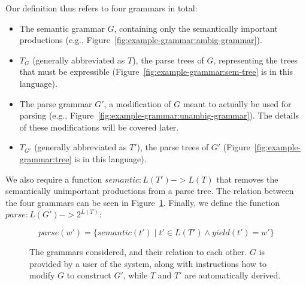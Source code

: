 \documentclass[sigplan]{acmart}\settopmatter{printfolios=true,printccs=false,printacmref=false}
\newcommand{\yield}{\mathit{yield}} %
\newcommand{\semantic}{\mathit{semantic}} %
\newcommand{\parse}{\mathit{parse}} %
\begin{document}
Our definition thus refers to four grammars in total:

\begin{itemize}
  \item The semantic grammar $G$, containing only the semantically important productions (e.g., Figure~\ref{fig:example-grammar:ambig-grammar}).
  \item $T_G$ (generally abbreviated as $T$), the parse trees of $G$, representing the trees that must be expressible (Figure~\ref{fig:example-grammar:sem-tree} is in this language).
  \item The parse grammar $G'$, a modification of $G$ meant to actually be used for parsing (e.g., Figure~\ref{fig:example-grammar:unambig-grammar}). The details of these modifications will be covered later. %
  \item $T_{G'}$ (generally abbreviated as $T'$), the parse trees of $G'$ (Figure~\ref{fig:example-grammar:tree} is in this language).
\end{itemize}

\noindent We also require a function $\semantic : L(T') -> L(T)$ that removes the semantically unimportant productions from a parse tree. The relation between the four grammars can be seen in Figure~\ref{fig:grammar-square}. Finally, we define the function $\parse : L(G') -> 2^{L(T)}$:

$$
\parse(w') = \{ \semantic(t') \mid t' \in L(T') \land \yield(t') = w' \}
$$

\begin{figure}
  \caption{The grammars considered, and their relation to each other. $G$ is provided by a user of the system, along with instructions how to modify $G$ to construct $G'$, while $T$ and $T'$ are automatically derived.}
  \label{fig:grammar-square}
\end{figure}

\end{document}
